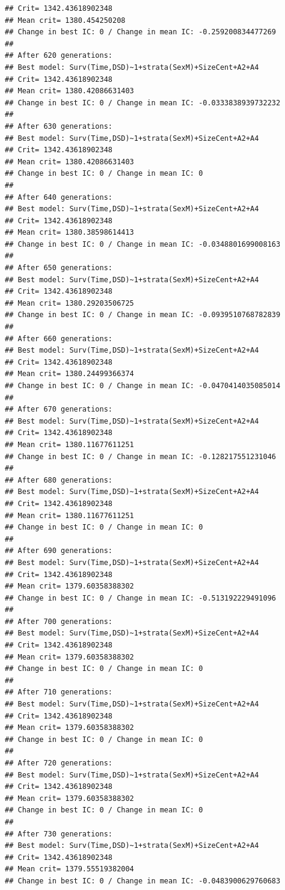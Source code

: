 \documentclass{article}\usepackage[]{graphicx}\usepackage[]{color}
\makeatletter
\newenvironment{kframe}{%
 \def\at@end@of@kframe{}%
 \ifinner\ifhmode%
  \def\at@end@of@kframe{\end{minipage}}%
  \begin{minipage}{\columnwidth}%
 \fi\fi%
 \def\FrameCommand##1{\hskip\@totalleftmargin \hskip-\fboxsep
 \colorbox{shadecolor}{##1}\hskip-\fboxsep
     \hskip-\linewidth \hskip-\@totalleftmargin \hskip\columnwidth}%
 \MakeFramed {\advance\hsize-\width
   \@totalleftmargin\z@ \linewidth\hsize
   \@setminipage}}%
 {\par\unskip\endMakeFramed%
 \at@end@of@kframe}
\newenvironment{knitrout}{}{} %
\makeatother
\begin{document}
\begin{knitrout}
\begin{kframe}
\begin{verbatim}
## Crit= 1342.43618902348
## Mean crit= 1380.454250208
## Change in best IC: 0 / Change in mean IC: -0.259200834477269
## 
## After 620 generations:
## Best model: Surv(Time,DSD)~1+strata(SexM)+SizeCent+A2+A4
## Crit= 1342.43618902348
## Mean crit= 1380.42086631403
## Change in best IC: 0 / Change in mean IC: -0.0333838939732232
## 
## After 630 generations:
## Best model: Surv(Time,DSD)~1+strata(SexM)+SizeCent+A2+A4
## Crit= 1342.43618902348
## Mean crit= 1380.42086631403
## Change in best IC: 0 / Change in mean IC: 0
## 
## After 640 generations:
## Best model: Surv(Time,DSD)~1+strata(SexM)+SizeCent+A2+A4
## Crit= 1342.43618902348
## Mean crit= 1380.38598614413
## Change in best IC: 0 / Change in mean IC: -0.0348801699008163
## 
## After 650 generations:
## Best model: Surv(Time,DSD)~1+strata(SexM)+SizeCent+A2+A4
## Crit= 1342.43618902348
## Mean crit= 1380.29203506725
## Change in best IC: 0 / Change in mean IC: -0.0939510768782839
## 
## After 660 generations:
## Best model: Surv(Time,DSD)~1+strata(SexM)+SizeCent+A2+A4
## Crit= 1342.43618902348
## Mean crit= 1380.24499366374
## Change in best IC: 0 / Change in mean IC: -0.0470414035085014
## 
## After 670 generations:
## Best model: Surv(Time,DSD)~1+strata(SexM)+SizeCent+A2+A4
## Crit= 1342.43618902348
## Mean crit= 1380.11677611251
## Change in best IC: 0 / Change in mean IC: -0.128217551231046
## 
## After 680 generations:
## Best model: Surv(Time,DSD)~1+strata(SexM)+SizeCent+A2+A4
## Crit= 1342.43618902348
## Mean crit= 1380.11677611251
## Change in best IC: 0 / Change in mean IC: 0
## 
## After 690 generations:
## Best model: Surv(Time,DSD)~1+strata(SexM)+SizeCent+A2+A4
## Crit= 1342.43618902348
## Mean crit= 1379.60358388302
## Change in best IC: 0 / Change in mean IC: -0.513192229491096
## 
## After 700 generations:
## Best model: Surv(Time,DSD)~1+strata(SexM)+SizeCent+A2+A4
## Crit= 1342.43618902348
## Mean crit= 1379.60358388302
## Change in best IC: 0 / Change in mean IC: 0
## 
## After 710 generations:
## Best model: Surv(Time,DSD)~1+strata(SexM)+SizeCent+A2+A4
## Crit= 1342.43618902348
## Mean crit= 1379.60358388302
## Change in best IC: 0 / Change in mean IC: 0
## 
## After 720 generations:
## Best model: Surv(Time,DSD)~1+strata(SexM)+SizeCent+A2+A4
## Crit= 1342.43618902348
## Mean crit= 1379.60358388302
## Change in best IC: 0 / Change in mean IC: 0
## 
## After 730 generations:
## Best model: Surv(Time,DSD)~1+strata(SexM)+SizeCent+A2+A4
## Crit= 1342.43618902348
## Mean crit= 1379.55519382004
## Change in best IC: 0 / Change in mean IC: -0.0483900629760683
\end{verbatim}



\end{kframe}
\end{knitrout}
\end{document}
